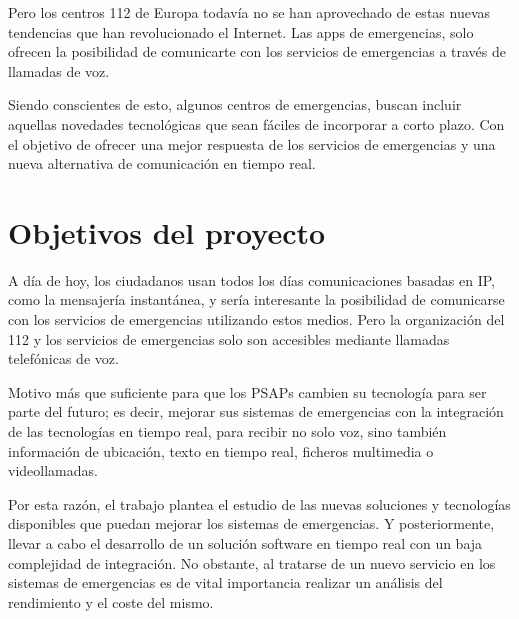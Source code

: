 Pero los centros 112 de Europa todavía no se han aprovechado de estas nuevas tendencias que han revolucionado el Internet. Las apps de emergencias, solo ofrecen la posibilidad de comunicarte con los servicios de emergencias a través de llamadas de voz.

Siendo conscientes de esto, algunos centros de emergencias, buscan incluir aquellas novedades tecnológicas que sean fáciles de incorporar a corto plazo. Con el objetivo de ofrecer una mejor respuesta de los servicios de emergencias y una nueva alternativa de comunicación en tiempo real.

\clearpage

\section{Objetivos del proyecto}

A día de hoy, los ciudadanos usan todos los días comunicaciones basadas en IP, como la mensajería instantánea, y sería interesante la posibilidad de comunicarse con los servicios de emergencias utilizando estos medios. Pero la organización del 112 y los servicios de emergencias solo son accesibles mediante llamadas telefónicas de voz.

Motivo más que suficiente para que los PSAPs cambien su tecnología para ser parte del futuro; es decir, mejorar sus sistemas de emergencias con la integración de las tecnologías en tiempo real, para recibir no solo voz, sino también información de ubicación, texto en tiempo real, ficheros multimedia o videollamadas.

Por esta razón, el trabajo plantea el estudio de las nuevas soluciones y tecnologías disponibles que puedan mejorar los sistemas de emergencias. Y posteriormente, llevar a cabo el desarrollo de un solución software en tiempo real con un baja complejidad de integración. No obstante, al tratarse de un nuevo servicio en los sistemas de emergencias es de vital importancia realizar un análisis del rendimiento y el coste del mismo.

